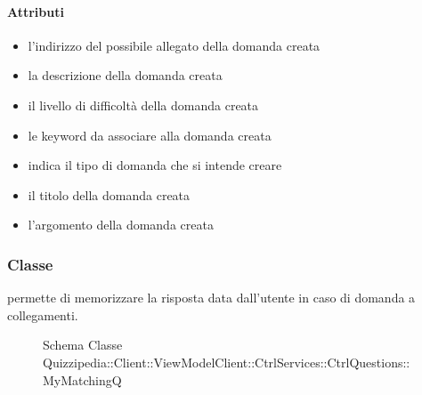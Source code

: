 \paragraph{Attributi}
\begin{itemize}
\item {}
\newline
l'indirizzo del possibile allegato della domanda creata
\item {}
\newline
la descrizione della domanda creata
\item {}
\newline
il livello di difficoltà della domanda creata
\item {}
\newline
le keyword da associare alla domanda creata
\item {}
\newline
indica il tipo di domanda che si intende creare
\item {}
\newline
il titolo della domanda creata
\item {}
\newline
l'argomento della domanda creata
\end{itemize}
\subsubsection{Classe }
permette di memorizzare la risposta data dall'utente in caso di domanda a collegamenti.
\begin{figure}[H]
\centering
\noindent{}
\caption[Schema Classe MyMatchingQ]{Schema Classe Quizzipedia::Client::ViewModelClient::CtrlServices::CtrlQuestions::MyMatchingQ}
\end{figure}
